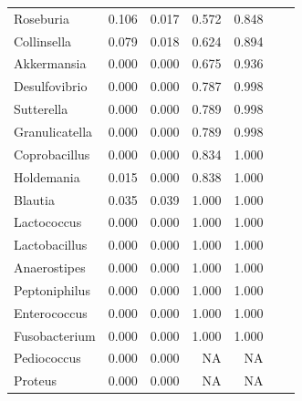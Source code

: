 {\begin{longtable}{ | l | r | r | r | r | r | r  | }
		   Roseburia & 0.106 & 0.017 & 0.572 & 0.848 \\ 
		   Collinsella & 0.079 & 0.018 & 0.624 & 0.894 \\ 
		   Akkermansia & 0.000 & 0.000 & 0.675 & 0.936 \\ 
		   Desulfovibrio & 0.000 & 0.000 & 0.787 & 0.998 \\ 
		   Sutterella & 0.000 & 0.000 & 0.789 & 0.998 \\ 
		   Granulicatella & 0.000 & 0.000 & 0.789 & 0.998 \\ 
		   Coprobacillus & 0.000 & 0.000 & 0.834 & 1.000 \\ 
		   Holdemania & 0.015 & 0.000 & 0.838 & 1.000 \\ 
		   Blautia & 0.035 & 0.039 & 1.000 & 1.000 \\ 
		   Lactococcus & 0.000 & 0.000 & 1.000 & 1.000 \\ 
		   Lactobacillus & 0.000 & 0.000 & 1.000 & 1.000 \\ 
		   Anaerostipes & 0.000 & 0.000 & 1.000 & 1.000 \\ 
		   Peptoniphilus & 0.000 & 0.000 & 1.000 & 1.000 \\ 
		   Enterococcus & 0.000 & 0.000 & 1.000 & 1.000 \\ 
		   Fusobacterium & 0.000 & 0.000 & 1.000 & 1.000 \\ 
		   Pediococcus & 0.000 & 0.000 & NA & NA \\ 
		   Proteus & 0.000 & 0.000 & NA & NA
		
	\end{longtable}
}










